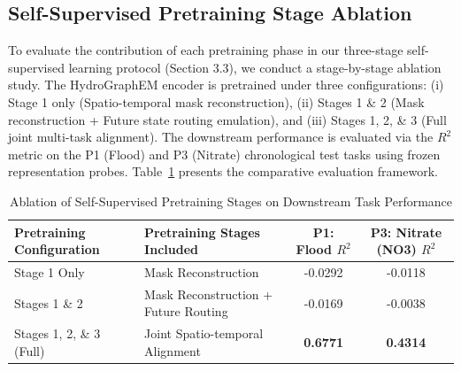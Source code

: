 \documentclass[preprint,12pt]{elsarticle}
\begin{document}
\subsection{Self-Supervised Pretraining Stage Ablation}
To evaluate the contribution of each pretraining phase in our three-stage self-supervised learning protocol (Section 3.3), we conduct a stage-by-stage ablation study. The HydroGraphEM encoder is pretrained under three configurations: (i) Stage 1 only (Spatio-temporal mask reconstruction), (ii) Stages 1 \& 2 (Mask reconstruction + Future state routing emulation), and (iii) Stages 1, 2, \& 3 (Full joint multi-task alignment). The downstream performance is evaluated via the $R^2$ metric on the P1 (Flood) and P3 (Nitrate) chronological test tasks using frozen representation probes. Table~\ref{tab:pretrain_ablation} presents the comparative evaluation framework.

\begin{table}[H]
\centering
\caption{Ablation of Self-Supervised Pretraining Stages on Downstream Task Performance}\label{tab:pretrain_ablation}
\begin{tabular}{llcc}
\toprule
Pretraining Configuration & Pretraining Stages Included & P1: Flood $R^2$ & P3: Nitrate (NO3) $R^2$ \\
\midrule
Stage 1 Only & Mask Reconstruction & -0.0292 & -0.0118 \\
Stages 1 \& 2 & Mask Reconstruction + Future Routing & -0.0169 & -0.0038 \\
Stages 1, 2, \& 3 (Full) & Joint Spatio-temporal Alignment & \textbf{0.6771} & \textbf{0.4314} \\
\bottomrule
\end{tabular}
\end{table}
\end{document}

